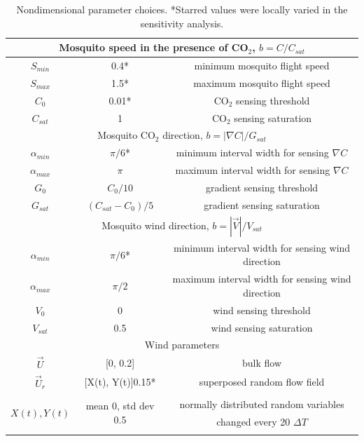\documentclass[12pt]{article}
\newif\ifcommentsw
\newcommand{\comment}[1]{\ifcommentsw  $\blacktriangleright$\ \textbf{#1}\ $\blacktriangleleft$ \fi}
\newcommand{\mycaption}[1]{\caption{#1}}
\begin{document}
\begin{table}[hbtp]
	\mycaption{Nondimensional parameter choices. *Starred values were locally varied in the sensitivity analysis. \comment{Is this the correct meaning of 'varied locally'  MH}  
	}
	\begin{center}
		\begin{tabular}{|c|c|c|}
			\hline
			\multicolumn{3}{|c|}{Mosquito speed in the presence of CO$_2$, $b=C/C_{sat}$} \\
			\hline
			$S_{min}$ & 0.4* & minimum mosquito flight speed\\
			$S_{max}$ & 1.5* & maximum mosquito flight speed\\
			$C_0$ & 0.01* & CO$_2$ sensing threshold\\
			$C_{sat}$ & 1 & CO$_2$ sensing saturation \\
			\hline
			\multicolumn{3}{|c|}{Mosquito CO$_2$ direction, $b=|\nabla C|/G_{sat}$} \\
			\hline
			$\alpha_{min}$ & $\pi/6$* & minimum interval width for sensing $\nabla C$\\
			$\alpha_{max}$ & $\pi$  & maximum interval width for sensing $\nabla C$\\
			$G_0$ & $C_0/10$  & gradient sensing threshold\\
			$G_{sat}$ & $(C_{sat}-C_0)/5$  & gradient sensing saturation\\
			\hline
			\multicolumn{3}{|c|}{Mosquito wind direction, $b=|\vec{V}|/V_{sat}$} \\
			 \hline
			$\alpha_{min}$ & $\pi/6$* & minimum interval width for sensing wind direction \\
			$\alpha_{max}$ & $\pi/2$ & maximum interval width for sensing wind direction \\
			$V_0$ & 0 & wind sensing threshold\\
			$V_{sat}$ & 0.5 & wind sensing saturation\\
			\hline
			\multicolumn{3}{|c|}{Wind parameters} \\
			\hline
			$\vec{U}$ & [0, 0.2] & bulk flow\\
			$\vec{U}_r$ & [X(t), Y(t)]0.15* & superposed random flow field \\
			\multirow{4}{*}{$X(t),Y(t)$} & \multirow{4}{*}{mean 0, std dev 0.5} & \\
			& & normally distributed random variables  \\
			& & changed every 20 $\Delta T$ \\
			&&\\

\end{tabular}
\end{center}
\end{table}
\end{document}
